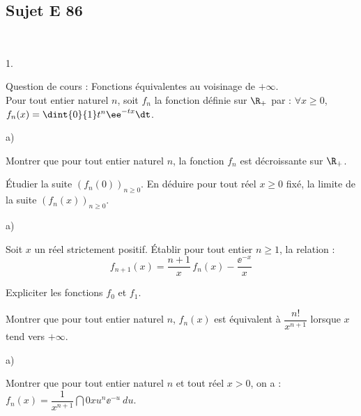 \documentclass[11pt]{article}
\begin{document}
\newpage


\subsection*{Sujet E 86}


\begin{exerciceAP}~
  \begin{noliste}{1.}
    \setlength{\itemsep}{2mm}
  \item Question de cours : Fonctions équivalentes au voisinage de
    $+\infty$.\\
    Pour tout entier naturel $n$, soit $f_n$ la fonction définie sur
    $\R_+$ par : $\forall x \geq 0$, $f_n(x)=\dint{0}{1} t^n \ee^{-tx}
    \dt$.
  
  \item
    \begin{noliste}{a)}
    \setlength{\itemsep}{2mm}
    \item Montrer que pour tout entier naturel $n$, la fonction 
      $f_n$ est décroissante sur $\R_+$.
      
    \item Étudier la suite $(f_n(0))_{n\geq 0}$. En déduire pour 
      tout réel $x\geq 0$ fixé, la limite de la suite $(f_n(x))_{n\geq 
        0}$.
    \end{noliste}
    
  \item 
    \begin{noliste}{a)}
    \setlength{\itemsep}{2mm}
    \item Soit $x$ un réel strictement positif. Établir pour tout
      entier $n\geq 1$, la relation :
      \[
      f_{n+1}(x)=\dfrac{n+1}{x} \, f_n(x)-\dfrac{\ee^{-x}}{x}
      \]
      
    \item Expliciter les fonctions $f_0$ et $f_1$.
      
    \item Montrer que pour tout entier naturel $n$, $f_n(x)$ est 
      équivalent à $\dfrac{n!}{x^{n+1}}$ lorsque $x$ tend vers $+\infty$.
    \end{noliste}
    
  \item 
    \begin{noliste}{a)}
    \setlength{\itemsep}{2mm}
    \item Montrer que pour tout entier naturel $n$ et tout réel $x>0$,
      on a : $f_n(x)=\dfrac{1}{x^{n+1}}\dint{0}{x} u^n \ee^{-u} \ du$.
    

\end{noliste}
\end{noliste}
\end{exerciceAP}
\end{document}

